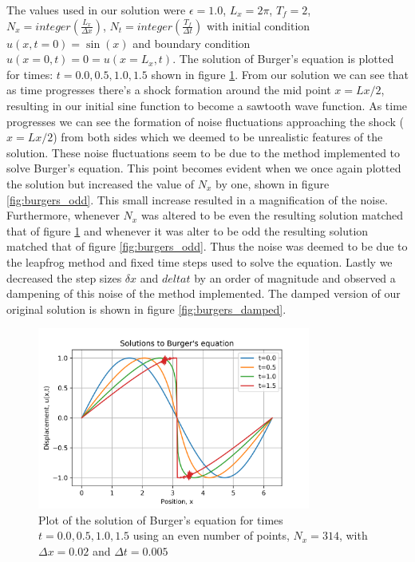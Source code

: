 \documentclass{article}
\begin{document}
The values used in our solution were $\epsilon = 1.0$, $L_x = 2 \pi $, $T_f = 2$, $N_x = integer(\frac{L_x}{\Delta x})$, $N_t = integer(\frac{T_f}{\Delta t})$ with initial condition $u(x, t=0)=\sin(x)$ and boundary condition $u(x=0,t)=0=u(x=L_x,t)$.
The solution of Burger's equation is plotted for times: $t=0.0,0.5,1.0,1.5$ shown in figure \ref{fig:burgers_even}.
From our solution we can see that as time progresses there's a shock formation around the mid point $x=Lx/2$, resulting in our initial sine function to become a sawtooth wave function. As time progresses we can see the formation of noise fluctuations approaching the shock ($x=Lx/2$) from both sides which we deemed to be unrealistic features of the solution. These noise fluctuations seem to be due to the method implemented to solve Burger's equation. This point becomes evident when we once again plotted the solution but increased the value of $N_x$ by one, shown in figure \ref{fig:burgers_odd}. This small increase resulted in a magnification of the noise. Furthermore, whenever $N_x$ was altered to be even the resulting solution matched that of figure \ref{fig:burgers_even} and whenever it was alter to be odd the resulting solution matched that of figure \ref{fig:burgers_odd}. Thus the noise was deemed to be due to the leapfrog method and fixed time steps used to solve the equation. Lastly we decreased the step sizes $\delta x$ and $delta t$ by an order of magnitude and observed a dampening of this noise of the method implemented. The damped version of our original solution is shown in figure \ref{fig:burgers_damped}. 

\begin{figure}[H]
	\centering
	\includegraphics[width=0.8\textwidth]{../images/burgers.png}
	\caption{Plot of the solution of Burger's equation for times $t=0.0,0.5,1.0,1.5$ using an even number of points, $N_x=314$, with $\Delta x=0.02$ and $\Delta t=0.005$}
	\label{fig:burgers_even}
\end{figure}
\end{document}
